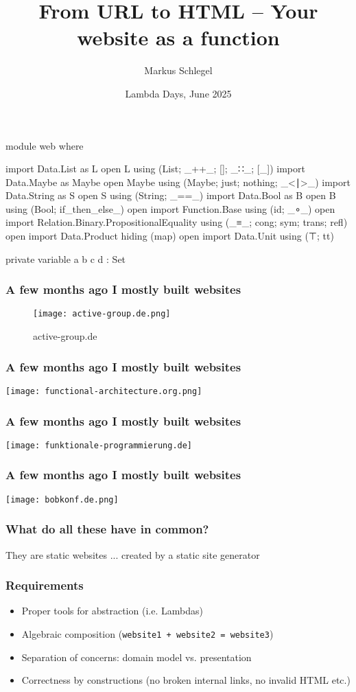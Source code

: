 \documentclass[aspectratio=169]{beamer}
\title{From URL to HTML -- Your website as a function}
\author{Markus Schlegel}
\institute{Active Group GmbH}
\date{Lambda Days, June 2025}
\begin{document}
\frame{\titlepage}

\begin{code}
module web where

import Data.List as L
open L using (List; _++_; []; _∷_; [_])
import Data.Maybe as Maybe
open Maybe using (Maybe; just; nothing; _<∣>_)
import Data.String as S
open S using (String; _==_)
import Data.Bool as B
open B using (Bool; if_then_else_)
open import Function.Base using (id; _∘_)
open import Relation.Binary.PropositionalEquality
  using (_≡_; cong; sym; trans; refl)
open import Data.Product hiding (map)
open import Data.Unit using (⊤; tt)

private
  variable
    a b c d : Set
\end{code}

\begin{frame}
\frametitle{A few months ago I mostly built websites}
\begin{figure}
\centering
    \texttt{[image: active-group.de.png]}
    \caption{active-group.de}
\end{figure}
\end{frame}

\begin{frame}
\frametitle{A few months ago I mostly built websites}
\texttt{[image: functional-architecture.org.png]}
\end{frame}

\begin{frame}
\frametitle{A few months ago I mostly built websites}
\texttt{[image: funktionale-programmierung.de]}
\end{frame}

\begin{frame}
\frametitle{A few months ago I mostly built websites}
\texttt{[image: bobkonf.de.png]}
\end{frame}

\begin{frame}
\frametitle{What do all these have in common?}
They are static websites ... created by a static site generator
\end{frame}

\begin{frame}
\frametitle{Requirements}
\begin{itemize}
  \item Proper tools for abstraction (i.e. Lambdas)
  \item Algebraic composition (\texttt{website1 + website2 = website3})
  \item Separation of concerns: domain model vs. presentation
  \item Correctness by constructions (no broken internal links, no invalid HTML etc.)
\end{itemize}
\end{frame}
\end{document}
